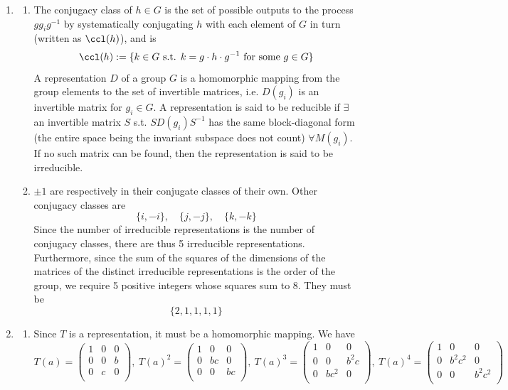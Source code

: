 \documentclass[a4paper]{article}
\begin{document}
\begin{ans}\leavevmode
\begin{enumerate}[label=(\roman*)]
\item
\begin{enumerate}[label=(\alph*)]
\item The conjugacy class of $h\in G$ is the set of possible outputs to the process $gg_ig^{-1}$ by systematically conjugating $h$ with each element of $G$ in turn (written as $\ccl(h)$), and is
$$\ccl(h):=\{k\in G\text{ s.t. }k=g\cdot h\cdot g^{-1}\text{ for some }g\in G\}$$
A representation $D$ of a group $G$ is a homomorphic mapping from the group elements to the set of invertible matrices, i.e. $D(g_i)$ is an invertible matrix for $g_i\in G$. A representation is said to be reducible if $\exists$ an invertible matrix $S$ s.t. $SD(g_i)S^{-1}$ has the same block-diagonal form (the entire space being the invariant subspace does not count) $\forall M(g_i)$. If no such matrix can be found, then the representation is said to be irreducible.
\item $\pm1$ are respectively in their conjugate classes of their own. Other conjugacy classes are
$$\{i,-i\},\quad\{j,-j\},\quad\{k,-k\}$$
Since the number of irreducible representations is the number of conjugacy classes, there are thus 5 irreducible representations. Furthermore, since the sum of the squares of the dimensions of the matrices of the distinct irreducible representations is the order of the group, we require 5 positive integers whose squares sum to 8. They must be
$$\{2,1,1,1,1\}$$
\end{enumerate}
\item 
\begin{enumerate}[label=(\alph*)]
\item Since $T$ is a representation, it must be a homomorphic mapping. We have
$$T(a)=\begin{pmatrix}1&0&0\\0&0&b\\0&c&0\\\end{pmatrix},~ T(a)^2=\begin{pmatrix}1&0&0\\0&bc&0\\0&0&bc\\\end{pmatrix},~ T(a)^3=\begin{pmatrix}1&0&0\\0&0&b^2c\\0&bc^2&0\\\end{pmatrix},~ T(a)^4=\begin{pmatrix}1&0&0\\0&b^2c^2&0\\0&0&b^2c^2\\\end{pmatrix}$$

\end{enumerate}
\end{enumerate}
\end{ans}
\end{document}

